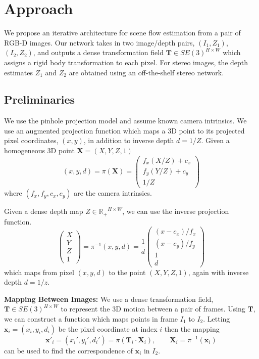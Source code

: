 \documentclass[final]{cvpr}
\begin{document}
\section{Approach}

We propose an iterative architecture for scene flow estimation from a pair of RGB-D images. Our network takes in two image/depth pairs, $(I_1, Z_1)$, $(I_2, Z_2)$, and outputs a dense transformation field $\mathbf{T} \in SE(3)^{H \times W}$ which assigns a rigid body transformation to each pixel. For stereo images, the depth estimates $Z_1$ and $Z_2$ are obtained using an off-the-shelf stereo network.

\subsection{Preliminaries}
We use the pinhole projection model and assume known camera intrinsics. We use an augmented projection function which maps a 3D point to its projected pixel coordinates, $(x,y)$, in addition to inverse depth $d = 1/Z$. Given a homogeneous 3D point $\mathbf{X} = (X, Y, Z, 1)$
\begin{equation}
    (x, y, d) = \pi(\mathbf{X}) = \begin{pmatrix} f_x (X/Z) + c_x \\ f_y (Y/Z) + c_y \\ 1/Z \end{pmatrix}
\end{equation}
where $(f_x, f_y, c_x, c_y)$ are the camera intrinsics.

Given a dense depth map $Z \in \mathbb{R_+}^{H\times W}$, we can use the inverse projection function.
\begin{equation}
    \begin{pmatrix} X \\ Y \\ Z \\ 1 \end{pmatrix} = \pi^{-1}(x,y,d) = \frac{1}{d} \begin{pmatrix} (x-c_x)/f_x \\ (x-c_y)/f_y \\ 1 \\ d  \end{pmatrix}
\end{equation}
which maps from pixel $(x, y, d)$ to the point $(X, Y, Z, 1)$, again with inverse depth $d = 1/z$.

\vspace{1mm} \noindent \textbf{Mapping Between Images:} We use a dense transformation field, $\mathbf{T} \in SE(3)^{H \times W}$ to represent the 3D motion between a pair of frames. Using $\mathbf{T}$, we can construct a function which maps points in frame $I_1$ to $I_2$. Letting $\mathbf{x}_{i}=(x_{i},y_{i},d_{i})$ be the pixel coordinate at index $i$ then the mapping
\begin{equation}
    \mathbf{x}'_{i} = (x_i', y_i', d_i') = \pi(\mathbf{T}_{i} \cdot \mathbf{X}_{i}), \qquad \mathbf{X}_{i} = \pi^{-1}(\mathbf{x}_{i})
    \label{eqn:mapping}
\end{equation}
can be used to find the correspondence of $\mathbf{x}_{i}$ in $I_2$.
\end{document}
